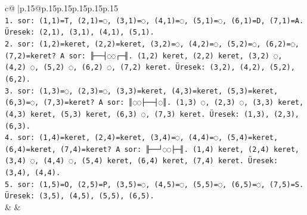 \documentclass{article}
\begin{document}
{\begin{supertabular}{c@{$\;$}|p{.15\linewidth}@{}p{.15\linewidth}p{.15\linewidth}p{.15\linewidth}p{.15\linewidth}p{.15\linewidth}}
{{{\\ 
\texttt{1. sor: (1,1)=T, (2,1)=◌, (3,1)=◌, (4,1)=◌, (5,1)=◌, (6,1)=D, (7,1)=A. Üresek: (2,1), (3,1), (4,1), (5,1).} \\
\texttt{2. sor: (1,2)=keret, (2,2)=keret, (3,2)=◌, (4,2)=◌, (5,2)=◌, (6,2)=◌, (7,2)=keret? A sor: ╟──┤◌◌┌─╢. (1,2) keret, (2,2) keret, (3,2) ◌, (4,2) ◌, (5,2) ◌, (6,2) ◌, (7,2) keret. Üresek: (3,2), (4,2), (5,2), (6,2).} \\
\texttt{3. sor: (1,3)=◌, (2,3)=◌, (3,3)=keret, (4,3)=keret, (5,3)=keret, (6,3)=◌, (7,3)=keret? A sor: ║◌◌├──┤◌║. (1,3) ◌, (2,3) ◌, (3,3) keret, (4,3) keret, (5,3) keret, (6,3) ◌, (7,3) keret. Üresek: (1,3), (2,3), (6,3).} \\
\texttt{4. sor: (1,4)=keret, (2,4)=keret, (3,4)=◌, (4,4)=◌, (5,4)=keret, (6,4)=keret, (7,4)=keret? A sor: ╟──┘◌◌├─╢. (1,4) keret, (2,4) keret, (3,4) ◌, (4,4) ◌, (5,4) keret, (6,4) keret, (7,4) keret. Üresek: (3,4), (4,4).} \\
\texttt{5. sor: (1,5)=O, (2,5)=P, (3,5)=◌, (4,5)=◌, (5,5)=◌, (6,5)=◌, (7,5)=S. Üresek: (3,5), (4,5), (5,5), (6,5).} \\
            }
        }
    }
    & & \\ \\


\end{supertabular}}
\end{document}
